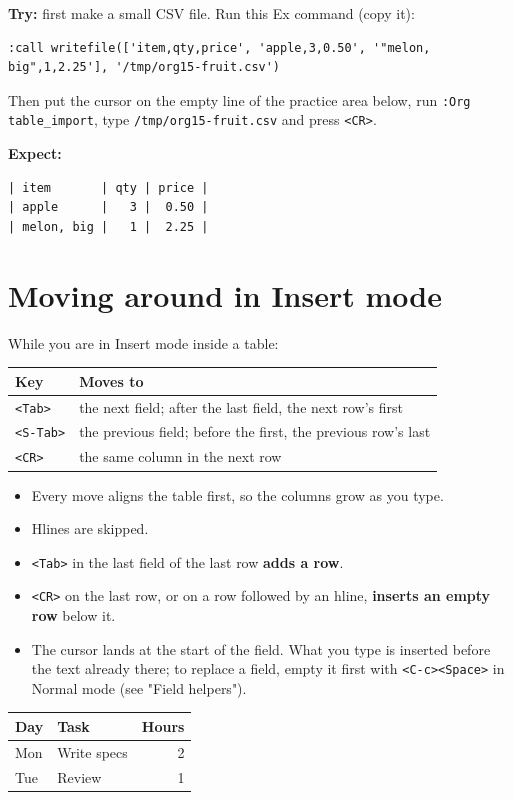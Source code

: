 \textbf{Try:} first make a small CSV file. Run this Ex command (copy it):

\begin{verbatim}
:call writefile(['item,qty,price', 'apple,3,0.50', '"melon, big",1,2.25'], '/tmp/org15-fruit.csv')
\end{verbatim}

Then put the cursor on the empty line of the practice area below, run
\texttt{:Org table\_import}, type \texttt{/tmp/org15-fruit.csv} and press \texttt{<CR>}.

\textbf{Expect:}
\begin{verbatim}
| item       | qty | price |
| apple      |   3 |  0.50 |
| melon, big |   1 |  2.25 |
\end{verbatim}
\section{Moving around in Insert mode}
\label{sec:org8242909}
While you are in Insert mode inside a table:

\begin{center}
\begin{tabular}{ll}
Key & Moves to\\
\hline
\texttt{<Tab>} & the next field; after the last field, the next row's first\\
\texttt{<S-Tab>} & the previous field; before the first, the previous row's last\\
\texttt{<CR>} & the same column in the next row\\
\end{tabular}
\end{center}

\begin{itemize}
\item Every move aligns the table first, so the columns grow as you type.
\item Hlines are skipped.
\item \texttt{<Tab>} in the last field of the last row \textbf{adds a row}.
\item \texttt{<CR>} on the last row, or on a row followed by an hline, \textbf{inserts an
empty row} below it.
\item The cursor lands at the start of the field. What you type is inserted
before the text already there; to replace a field, empty it first with
\texttt{<C-c><Space>} in Normal mode (see "Field helpers").
\end{itemize}

\begin{table}[htbp]
\label{tab:org8f24d88}
\centering
\begin{tabular}{llr}
Day & Task & Hours\\
\hline
Mon & Write specs & 2\\
Tue & Review & 1\\
\end{tabular}
\end{table}

